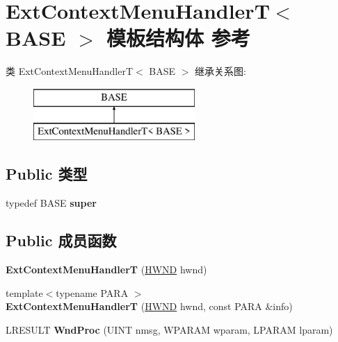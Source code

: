 \hypertarget{struct_ext_context_menu_handler_t}{}\section{Ext\+Context\+Menu\+HandlerT$<$ B\+A\+SE $>$ 模板结构体 参考}
\label{struct_ext_context_menu_handler_t}
类 Ext\+Context\+Menu\+HandlerT$<$ B\+A\+SE $>$ 继承关系图\+:\begin{figure}[H]
\begin{center}
\leavevmode
\includegraphics[height=2.000000cm]{struct_ext_context_menu_handler_t}
\end{center}
\end{figure}
\subsection*{Public 类型}
\begin{DoxyCompactItemize}
\item 
\mbox{\label{struct_ext_context_menu_handler_t_aaab65652f2f31bd135cbbcfe8a015bb3}} 
typedef B\+A\+SE {\bfseries super}
\end{DoxyCompactItemize}
\subsection*{Public 成员函数}
\begin{DoxyCompactItemize}
\item 
\mbox{\label{struct_ext_context_menu_handler_t_af00cd1f167550be2b09d45e186db86ef}} 
{\bfseries Ext\+Context\+Menu\+HandlerT} (\hyperlink{interfacevoid}{H\+W\+ND} hwnd)
\item 
\mbox{\label{struct_ext_context_menu_handler_t_a31434fa86e5d5f1a43141ae82432c890}} 
{\footnotesize template$<$typename P\+A\+RA $>$ }\\{\bfseries Ext\+Context\+Menu\+HandlerT} (\hyperlink{interfacevoid}{H\+W\+ND} hwnd, const P\+A\+RA \&info)
\item 
\mbox{\label{struct_ext_context_menu_handler_t_abb623fdedd31b5c59facad9994aa57bf}} 
L\+R\+E\+S\+U\+LT {\bfseries Wnd\+Proc} (U\+I\+NT nmsg, W\+P\+A\+R\+AM wparam, L\+P\+A\+R\+AM lparam)
\end{DoxyCompactItemize}
